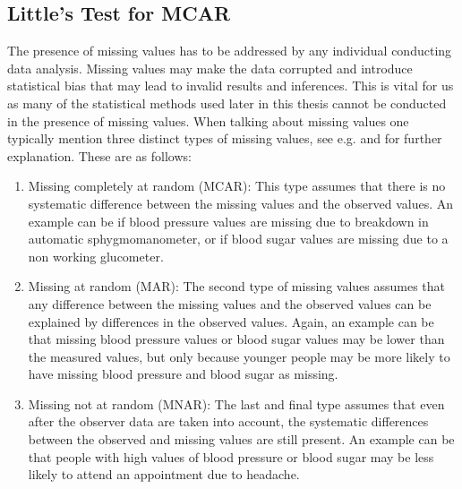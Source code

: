 \documentclass[../thesis.tex]{subfiles}
\begin{document}
\subsection{Little's Test for MCAR}
\label{subsec:little}

\noindent The presence of missing values has to be addressed by any individual conducting data analysis. Missing values may make the data corrupted and introduce statistical bias that may lead to invalid results and inferences. This is vital for us as many of the statistical methods used later in this thesis cannot be conducted in the presence of missing values. When talking about missing values one typically mention three distinct types of missing values, see e.g. \cite{sterne2009multiple} and \cite{kaushal2014missing} for further explanation. These are as follows:

\begin{enumerate}[label=(\roman*)]
    \item Missing completely at random (MCAR): This type assumes that there is no systematic difference between the missing values and the observed values. An example can be if blood pressure values are missing due to breakdown in automatic sphygmomanometer, or if blood sugar values are missing due to a non working glucometer.
    \item Missing at random (MAR): The second type of missing values assumes that any difference between the missing values and the observed values can be explained by differences in the observed values. Again, an example can be that missing blood pressure values or blood sugar values may be lower than the measured values, but only because younger people may be more likely to have missing blood pressure and blood sugar as missing.
    \item Missing not at random (MNAR): The last and final type assumes that even after the observer data are taken into account, the systematic differences between the observed and missing values are still present. An example can be that people with high values of blood pressure or blood sugar may be less likely to attend an appointment due to headache.  
\end{enumerate}
\end{document}

